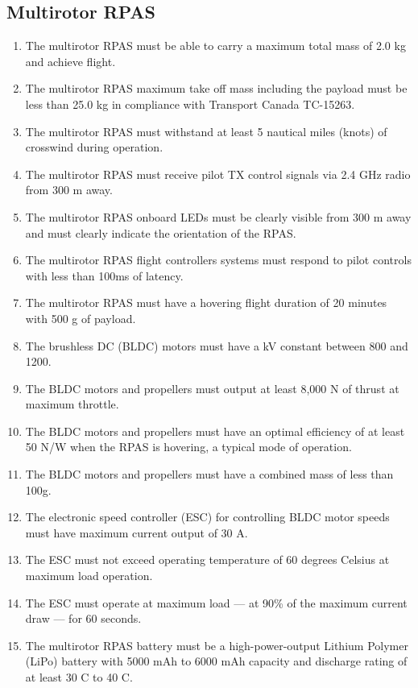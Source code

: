 \documentclass[10pt,letterpaper]{article}
\begin{document}
\subsection{Multirotor RPAS}
\begin{enumerate}[label=NF.DR.\arabic*, wide=1cm, widest=3cm, leftmargin=*, font=\bfseries, noitemsep,topsep=0pt, parsep=4pt, partopsep=0pt]
	\item The multirotor RPAS must be able to carry a maximum total mass of 2.0 kg and achieve flight.
	\item The multirotor RPAS maximum take off mass including the payload must be less than 25.0 kg in compliance with Transport Canada TC-15263.\cite{tp15263}
	\item The multirotor RPAS must withstand at least 5 nautical miles (knots) of crosswind during operation.
	\item The multirotor RPAS must receive pilot TX control signals via 2.4 GHz radio from 300 m away.
	\item The multirotor RPAS onboard LEDs must be clearly visible from 300 m away and must clearly indicate the orientation of the RPAS.
	\item The multirotor RPAS flight controllers systems must respond to pilot controls with less than 100ms of latency.
	\item The multirotor RPAS must have a hovering flight duration of 20 minutes with 500 g of payload.
	\item The brushless DC (BLDC) motors must have a kV constant between 800 and 1200.
	\item The BLDC motors and propellers must output at least 8,000 N of thrust at maximum throttle.
	\item The BLDC motors and propellers must have an optimal efficiency of at least 50 N/W when the RPAS is hovering, a typical mode of operation.
	\item The BLDC motors and propellers must have a combined mass of less than 100g.
	\item The electronic speed controller (ESC) for controlling BLDC motor speeds must have maximum current output of 30 A.
	\item The ESC must not exceed operating temperature of 60 degrees Celsius at maximum load operation.
	\item The ESC must operate at maximum load --- at 90\% of the maximum current draw --- for 60 seconds.
	\item The multirotor RPAS battery must be a high-power-output Lithium Polymer (LiPo) battery with 5000 mAh to 6000 mAh capacity and discharge rating of at least 30 C to 40 C.

\end{enumerate}
\end{document}
